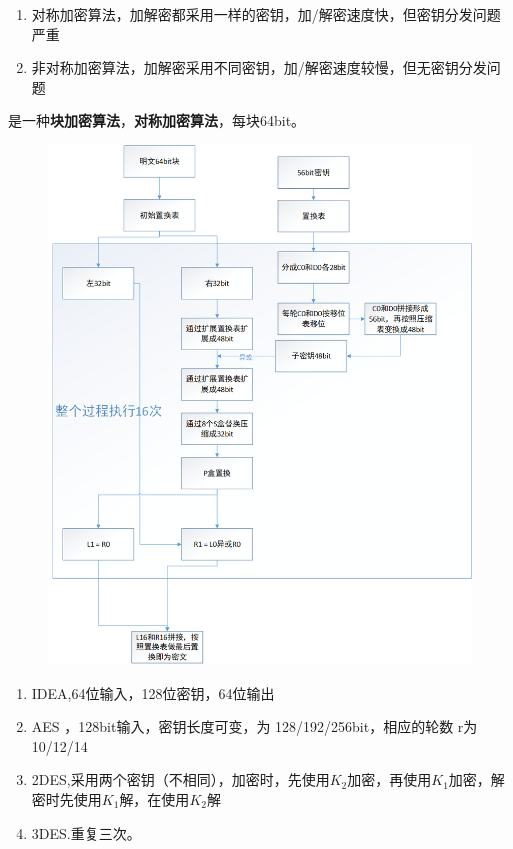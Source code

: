 \begin{enumerate}
	\item 对称加密算法，加解密都采用一样的密钥，加/解密速度快，但密钥分发问题严重
	\item 非对称加密算法，加解密采用不同密钥，加/解密速度较慢，但无密钥分发问题
\end{enumerate}

 是一种\textbf{块加密算法}，\textbf{对称加密算法}，每块64bit。
\begin{figure}[H]
	\centering
	\includegraphics[width=0.7\linewidth]{figures/screenshot007}
	\caption{}
	\label{fig:screenshot007}
\end{figure}

\begin{enumerate}
	\item IDEA,64位输入，128位密钥，64位输出
	\item AES ，128bit输入，密钥长度可变，为 128/192/256bit，相应的轮数 r为 10/12/14
	\item 2DES,采用两个密钥（不相同），加密时，先使用$ K_2 $加密，再使用$ K_1 $加密，解密时先使用$ K_1 $解，在使用$ K_2 $解
	\item 3DES.重复三次。
\end{enumerate}

